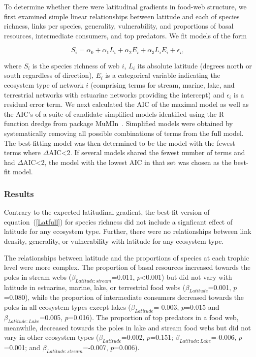 \documentclass[12pt]{article}
\begin{document}
    To determine whether there were latitudinal gradients in food-web structure,
    we first examined simple linear relationships between latitude and each of 
    species richness, links per species, generality, vulnerability, and proportions
    of basal resources, intermediate consumers, and top predators. We fit models of the form

    \begin{equation}
    \label{Latfull}
    S_{i} = \alpha_{0} + \alpha_{1} L_{i} + \alpha_{2} E_{i} + \alpha_{3} L_{i} E_{i} + \epsilon_{i} ,
    \end{equation}

    \noindent where $S_{i}$ is the species richness of web $i$, $L_{i}$ its absolute
    latitude (degrees north or south  regardless of direction), $E_{i}$ is a categorical
    variable indicating the ecosystem type of network $i$ (comprising terms for stream, 
    marine, lake, and terrestrial networks with estuarine
    networks providing the intercept) and $\epsilon_{i}$ is a residual error term. 
    We next calculated the AIC
    of the maximal model as well as the AIC's of a suite of candidate simplified models identified
    using the R~\citep{R} function dredge from package MuMIn~\citep{MuMIn}. 
    Simplified models were obtained by
    systematically removing all possible combinations of terms from the full model.
    The best-fitting model was then determined to be the model with the fewest terms 
    where $\Delta$AIC\textless2. If several models shared the fewest number of terms 
    and had $\Delta$AIC\textless2, the model with the lowest AIC in that set was chosen as the best-fit
    model.


  \subsubsection*{Results}
    Contrary to the expected latitudinal gradient, the best-fit version of
    equation~(\ref{Latfull}) for species richness did not 
    include a signficant effect of latitude for any 
    ecosystem type. Further, there were no relationships
    between link density, generality, or vulnerability
    with latitude for any ecosystem type.


    The relationships between latitude and the proportions of species at each trophic level were more complex. 
    The proportion of basal resources increased towards the poles in stream webs ($\beta_{Latitude:stream}$=0.011, $p$\textless0.001) 
    but did not vary with latitude in estuarine, marine, lake, or terrestrial 
    food webs ($\beta_{Latitude}$=0.001, $p$=0.080),
    while the proportion of intermediate consumers decreased towards the poles in all ecosystem types
    except lakes ($\beta_{Latitude}$=-0.003, $p$=0.015 and
    $\beta_{Latitude:Lake}$=0.005, $p$=0.016).
    The proportion of top predators in a food web, 
    meanwhile, decreased towards the poles in lake and 
    stream food webs but did not vary in other ecosystem
    types ($\beta_{Latitude}$=0.002, $p$=0.151; 
    $\beta_{Latitude:Lake}$=-0.006, $p$=0.001; and
    $\beta_{Latitude:stream}$=-0.007, $p$=0.006).
\end{document}
